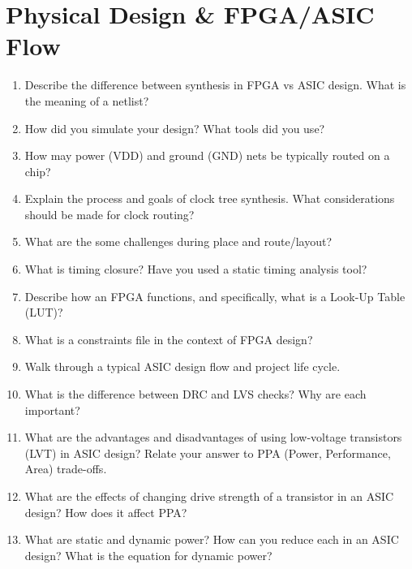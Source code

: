 \documentclass[11pt]{article}
\begin{document}
\section{Physical Design \& FPGA/ASIC Flow}
\begin{enumerate}
    \item Describe the difference between synthesis in FPGA vs ASIC design.
    What is the meaning of a netlist?
    \item How did you simulate your design? What tools did you use?
    \item How may power (VDD) and ground (GND) nets be typically routed on a
    chip?
    \item Explain the process and goals of clock tree synthesis. What
    considerations should be made for clock routing?
    \item What are the some challenges during place and route/layout?
    \item What is timing closure? Have you used a static timing analysis tool?
    \item Describe how an FPGA functions, and specifically, what is a Look-Up
    Table (LUT)?
    \item What is a constraints file in the context of FPGA design?
    \item Walk through a typical ASIC design flow and project life cycle.
    \item What is the difference between DRC and LVS checks? Why are each important?
    \item What are the advantages and disadvantages of using low-voltage
    transistors (LVT) in ASIC design? Relate your answer to PPA (Power,
    Performance, Area) trade-offs.
    \item What are the effects of changing drive strength of a transistor in an
    ASIC design? How does it affect PPA?
    \item What are static and dynamic power? How can you reduce each in an ASIC
    design? What is the equation for dynamic power?
\end{enumerate}

\end{document}
